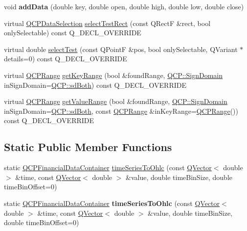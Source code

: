 \begin{DoxyCompactItemize}
\item 
void {\bfseries add\+Data} (double key, double open, double high, double low, double close)\hypertarget{class_q_c_p_financial_a688bbd052e00a02954ddb0068b378170}{}\label{class_q_c_p_financial_a688bbd052e00a02954ddb0068b378170}

\item 
virtual \hyperlink{class_q_c_p_data_selection}{Q\+C\+P\+Data\+Selection} \hyperlink{class_q_c_p_financial_a2d7c9beec376fed78a6091a17f59eb1e}{select\+Test\+Rect} (const Q\+RectF \&rect, bool only\+Selectable) const Q\+\_\+\+D\+E\+C\+L\+\_\+\+O\+V\+E\+R\+R\+I\+DE
\item 
virtual double \hyperlink{class_q_c_p_financial_a6067c625621b07a85a6989a0a4b8d309}{select\+Test} (const Q\+PointF \&pos, bool only\+Selectable, Q\+Variant $\ast$details=0) const Q\+\_\+\+D\+E\+C\+L\+\_\+\+O\+V\+E\+R\+R\+I\+DE
\item 
virtual \hyperlink{class_q_c_p_range}{Q\+C\+P\+Range} \hyperlink{class_q_c_p_financial_abb56add5757f53239d8bef462bd53578}{get\+Key\+Range} (bool \&found\+Range, \hyperlink{namespace_q_c_p_afd50e7cf431af385614987d8553ff8a9}{Q\+C\+P\+::\+Sign\+Domain} in\+Sign\+Domain=\hyperlink{namespace_q_c_p_afd50e7cf431af385614987d8553ff8a9a3dee7e9cd2fedce9253b83e172626a6c}{Q\+C\+P\+::sd\+Both}) const Q\+\_\+\+D\+E\+C\+L\+\_\+\+O\+V\+E\+R\+R\+I\+DE
\item 
virtual \hyperlink{class_q_c_p_range}{Q\+C\+P\+Range} \hyperlink{class_q_c_p_financial_ac3ce2b2c76c755078f9a0a4c84802de6}{get\+Value\+Range} (bool \&found\+Range, \hyperlink{namespace_q_c_p_afd50e7cf431af385614987d8553ff8a9}{Q\+C\+P\+::\+Sign\+Domain} in\+Sign\+Domain=\hyperlink{namespace_q_c_p_afd50e7cf431af385614987d8553ff8a9a3dee7e9cd2fedce9253b83e172626a6c}{Q\+C\+P\+::sd\+Both}, const \hyperlink{class_q_c_p_range}{Q\+C\+P\+Range} \&in\+Key\+Range=\hyperlink{class_q_c_p_range}{Q\+C\+P\+Range}()) const Q\+\_\+\+D\+E\+C\+L\+\_\+\+O\+V\+E\+R\+R\+I\+DE
\end{DoxyCompactItemize}
\subsection*{Static Public Member Functions}
\begin{DoxyCompactItemize}
\item 
static \hyperlink{class_q_c_p_data_container}{Q\+C\+P\+Financial\+Data\+Container} \hyperlink{class_q_c_p_financial_a9a058c035040d3939b8884f4aaccb1a7}{time\+Series\+To\+Ohlc} (const \hyperlink{class_q_vector}{Q\+Vector}$<$ double $>$ \&time, const \hyperlink{class_q_vector}{Q\+Vector}$<$ double $>$ \&value, double time\+Bin\+Size, double time\+Bin\+Offset=0)
\item 
static \hyperlink{class_q_c_p_data_container}{Q\+C\+P\+Financial\+Data\+Container} {\bfseries time\+Series\+To\+Ohlc} (const \hyperlink{class_q_vector}{Q\+Vector}$<$ double $>$ \&time, const \hyperlink{class_q_vector}{Q\+Vector}$<$ double $>$ \&value, double time\+Bin\+Size, double time\+Bin\+Offset=0)\hypertarget{class_q_c_p_financial_a65dd164f9c4dc7b031c39128b06e9279}{}\label{class_q_c_p_financial_a65dd164f9c4dc7b031c39128b06e9279}

\end{DoxyCompactItemize}
